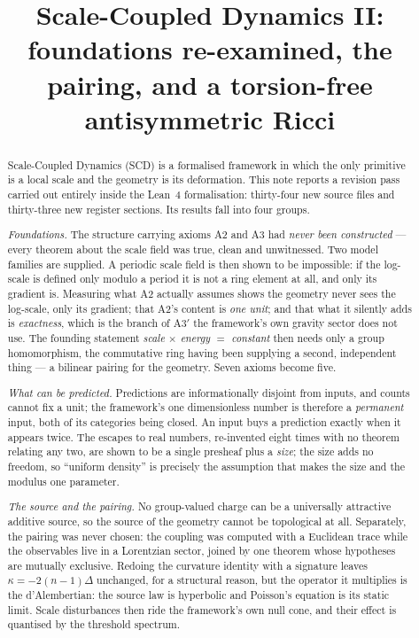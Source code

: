 \documentclass[11pt,a4paper]{article}
\title{\bf Scale-Coupled Dynamics II:\\
foundations re-examined, the pairing, and a torsion-free antisymmetric Ricci}
\author{}
\date{}
\theoremstyle{definition}
\theoremstyle{remark}
\newcommand{\Athree}{\ensuremath{\mathrm{A3}'}}
\begin{document}
\maketitle

\begin{abstract}
Scale-Coupled Dynamics (SCD) is a formalised framework in which the only
primitive is a local scale and the geometry is its deformation. This note reports
a revision pass carried out entirely inside the Lean~4 formalisation: thirty-four
new source files and thirty-three new register sections. Its results fall into
four groups.

\emph{Foundations.} The structure carrying axioms A2 and A3 had \emph{never been
constructed} --- every theorem about the scale field was true, clean and
unwitnessed. Two model families are supplied. A periodic scale field is then shown
to be impossible: if the log-scale is defined only modulo a period it is not a
ring element at all, and only its gradient is. Measuring what A2 actually assumes
shows the geometry never sees the log-scale, only its gradient; that A2's content
is \emph{one unit}; and that what it silently adds is \emph{exactness}, which is
the branch of \Athree{} the framework's own gravity sector does not use. The
founding statement \emph{scale $\times$ energy $=$ constant} then needs only a
group homomorphism, the commutative ring having been supplying a second,
independent thing --- a bilinear pairing for the geometry. Seven axioms become
five.

\emph{What can be predicted.} Predictions are informationally disjoint from
inputs, and counts cannot fix a unit; the framework's one dimensionless number is
therefore a \emph{permanent} input, both of its categories being closed. An input
buys a prediction exactly when it appears twice. The escapes to real numbers,
re-invented eight times with no theorem relating any two, are shown to be a single
presheaf plus a \emph{size}; the size adds no freedom, so ``uniform density'' is
precisely the assumption that makes the size and the modulus one parameter.

\emph{The source and the pairing.} No group-valued charge can be a universally
attractive additive source, so the source of the geometry cannot be topological at
all. Separately, the pairing was never chosen: the coupling was computed with a
Euclidean trace while the observables live in a Lorentzian sector, joined by one
theorem whose hypotheses are mutually exclusive. Redoing the curvature identity
with a signature leaves $\kappa=-2(n-1)\Delta$ unchanged, for a structural reason,
but the operator it multiplies is the d'Alembertian: the source law is hyperbolic
and Poisson's equation is its static limit. Scale disturbances then ride the
framework's own null cone, and their effect is quantised by the threshold
spectrum.


\end{abstract}
\end{document}
